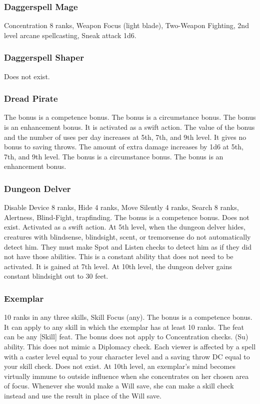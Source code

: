 \subsubsection{Daggerspell Mage}
 Concentration 8 ranks, Weapon Focus (light blade), Two-Weapon Fighting, 2nd level arcane spellcasting, Sneak attack \plus1d6.
\subsubsection{Daggerspell Shaper}
Does not exist.
\subsubsection{Dread Pirate}
 The bonus is a competence bonus.
 The bonus is a circumstance bonus.
 The bonus is an enhancement bonus. It is activated as a swift action. The value of the bonus and the number of uses per day increases at 5th, 7th, and 9th level. It gives no bonus to saving throws.
 The amount of extra damage increases by 1d6 at 5th, 7th, and 9th level.
 The bonus is a circumstance bonus.
 The bonus is an enhancement bonus.
\subsubsection{Dungeon Delver}
 Disable Device 8 ranks, Hide 4 ranks, Move Silently 4 ranks, Search 8 ranks, Alertness, Blind-Fight, trapfinding.
 The bonus is a competence bonus.
 Does not exist.
 Activated as a swift action.
 At 5th level, when the dungeon delver hides, creatures with blindsense, blindsight, scent, or tremorsense do not automatically detect him. They must make Spot and Listen checks to detect him as if they did not have those abilities.
 This is a constant ability that does not need to be activated. It is gained at 7th level.
 At 10th level, the dungeon delver gains constant blindsight out to 30 feet.
\subsubsection{Exemplar}
 10 ranks in any three skills, Skill Focus (any).
 The bonus is a  competence bonus. It can apply to any skill in which the exemplar has at least 10 ranks.
 The feat can be any [Skill] feat.
 The bonus does not apply to Concentration checks.
 (Su) ability. This does not mimic a Diplomacy check. Each viewer is affected by a  spell with a caster level equal to your character level and a saving throw DC equal to your skill check.
 Does not exist.
 At 10th level, an exemplar's mind becomes virtually immune to outside influence when she concentrates on her chosen area of focus. Whenever she would make a Will save, she can make a skill check instead and use the result in place of the Will save.
